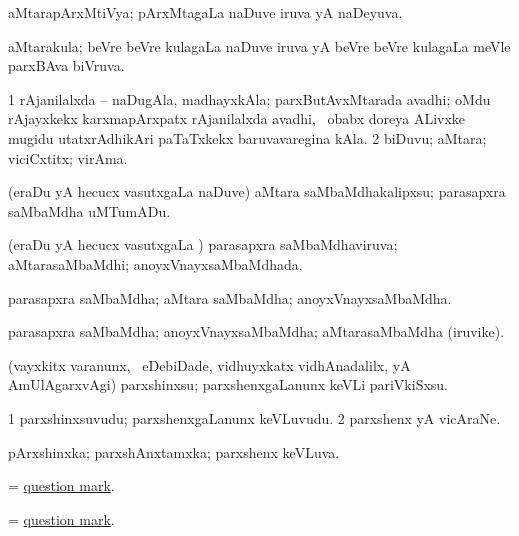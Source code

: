 \bentry
{}
\gl{\gu}
\bmng
aMtarapArxMtiVya; pArxMtagaLa naDuve iruva yA naDeyuva. 
\emng
\eentry

\bentry
{}
\gl{\gu}
\bmng
aMtarakula; beVre beVre kulagaLa naDuve iruva yA beVre beVre kulagaLa meVle parxBAva biVruva. 
\emng
\eentry

\bentry
{}
\gl{\nA}
\bmng
\bnum
\num{1} rAjanilalxda -- naDugAla, madhayxkAla; parxButAvxMtarada avadhi; oMdu rAjayxkekx karxmapArxpatx rAjanilalxda avadhi, \kanmu\ obabx doreya ALivxke mugidu utatxrAdhikAri paTaTxkekx baruvavaregina kAla. 
\num{2} biDuvu; aMtara; viciCxtitx; virAma. 
\enum
\emng
\eentry

\bentry
{}
\gl{\sakirx}
\bmng
(eraDu yA hecucx vasutxgaLa naDuve) aMtara saMbaMdhakalipxsu; parasapxra saMbaMdha uMTumADu. 
\emng
\eentry

\bentry
{}
\gl{\gu}
\bmng
(eraDu yA hecucx vasutxgaLa \vi) parasapxra saMbaMdhaviruva; aMtarasaMbaMdhi; anoyxVnayxsaMbaMdhada. 
\emng
\eentry

\bentry
{}
\gl{\nA}
\bmng
parasapxra saMbaMdha; aMtara saMbaMdha; anoyxVnayxsaMbaMdha. 
\emng
\eentry

\bentry
{}
\gl{\nA}
\bmng
parasapxra saMbaMdha; anoyxVnayxsaMbaMdha; aMtarasaMbaMdha (iruvike). 
\emng
\eentry

\bentry
{}
\gl{\sakirx}
\bmng
(vayxkitx \mo varanunx, \kanmu\ eDebiDade, vidhuyxkatx vidhAnadalilx, yA AmUlAgarxvAgi) parxshinxsu; parxshenxgaLanunx keVLi pariVkiSxsu. 
\emng
\eentry

\bentry
{}
\gl{\nA}
\bmng
\bnum
\num{1} parxshinxsuvudu; parxshenxgaLanunx keVLuvudu. 
\num{2} parxshenx yA vicAraNe. 
\enum
\emng
\eentry

\bentry
{}
\gl{\gu}
\bmng
pArxshinxka; parxshAnxtamxka; parxshenx keVLuva. 
\emng
\eentry

\bentry
{}
\gl{\nA}
\bmng
= \hyperref{kandict_q.pdf}{Q}{question mark}{question mark}. 
\emng
\eentry

\bentry
{}
\gl{\nA}
\bmng
= \hyperref{kandict_q.pdf}{Q}{question mark}{question mark}. 
\emng
\eentry

